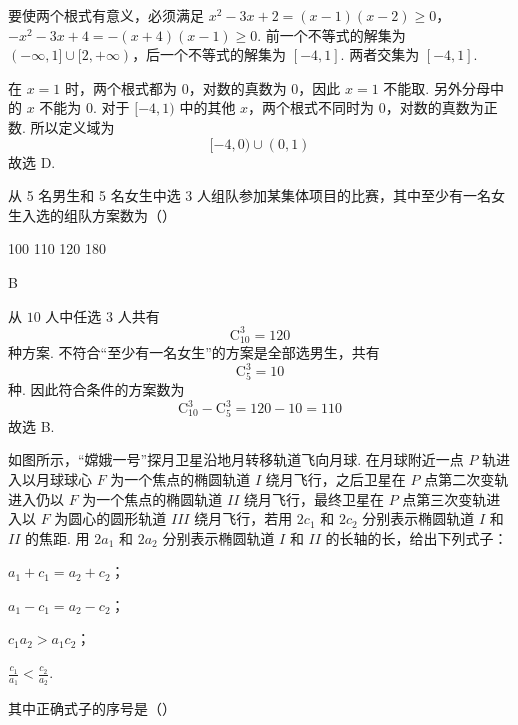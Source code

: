 \begin{solution}
要使两个根式有意义，必须满足
\(x^2-3x+2=(x-1)(x-2)\geqslant0\)，\(-x^2-3x+4=-(x+4)(x-1)\geqslant0\).
前一个不等式的解集为 \((-\infty,1]\cup[2,+\infty)\)，后一个不等式的解集为 \([-4,1]\). 两者交集为 \([-4,1]\).

在 \(x=1\) 时，两个根式都为 \(0\)，对数的真数为 \(0\)，因此 \(x=1\) 不能取. 另外分母中的 \(x\) 不能为 \(0\). 对于 \([-4,1)\) 中的其他 \(x\)，两个根式不同时为 \(0\)，对数的真数为正数. 所以定义域为
\[
[-4,0)\cup(0,1)
\]
故选 D.
\end{solution}

\begin{problem}
从 5 名男生和 5 名女生中选 3 人组队参加某集体项目的比赛，其中至少有一名女生入选的组队方案数为（\quad）

\choices
    {100}
    {110}
    {120}
    {180}
\end{problem}

\begin{answer}
B
\end{answer}

\begin{solution}
从 \(10\) 人中任选 \(3\) 人共有
\[
\mathrm C_{10}^{3}=120
\]
种方案. 不符合“至少有一名女生”的方案是全部选男生，共有
\[
\mathrm C_{5}^{3}=10
\]
种. 因此符合条件的方案数为
\[
\mathrm C_{10}^{3}-\mathrm C_{5}^{3}=120-10=110
\]
故选 B.
\end{solution}

\begin{problem}
如图所示，“嫦娥一号”探月卫星沿地月转移轨道飞向月球. 在月球附近一点 \(P\) 轨进入以月球球心 \(F\) 为一个焦点的椭圆轨道 \(I\) 绕月飞行，之后卫星在 \(P\) 点第二次变轨进入仍以 \(F\) 为一个焦点的椭圆轨道 \(II\) 绕月飞行，最终卫星在 \(P\) 点第三次变轨进入以 \(F\) 为圆心的圆形轨道 \(III\) 绕月飞行，若用 \(2c_{1}\) 和 \(2c_{2}\) 分别表示椭圆轨道 \(I\) 和 \(II\) 的焦距. 用 \(2a_{1}\) 和 \(2a_{2}\) 分别表示椭圆轨道 \(I\) 和 \(II\) 的长轴的长，给出下列式子：

\begin{circlelist}
    \item \( a_{1} + c_{1} = a_{2} + c_{2} \)；
    \item  \( a_{1} - c_{1} = a_{2} - c_{2} \)；
    \item  \( c_{1}a_{2} > a_{1}c_{2} \)；
    \item  \( \frac{c_{1}}{a_{1}} < \frac{c_{2}}{a_{2}} \).
\end{circlelist}
其中正确式子的序号是（\quad）


\choices
    {}
    {}
    {}
    {}
\end{problem}

